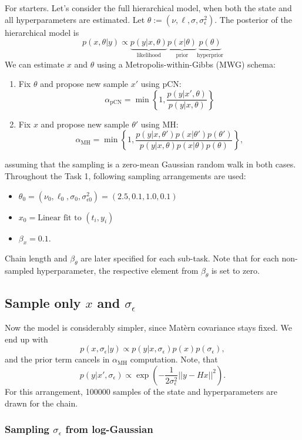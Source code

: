 \documentclass[times, a4paper, 12pt, onecolumn, oneside]{article}
\begin{document}
For starters. Let's consider the full hierarchical model, when both the state and all hyperparameters are estimated. Let $\theta:=(\nu, \ell, \sigma, \sigma_\epsilon^2)$. The posterior of the hierarchical model is
$$
p(x, \theta | y) \propto \underbrace{p(y | x, \theta)}_\text{likelihood} \underbrace{p(x | \theta)}_\text{prior} \underbrace{p(\theta)}_\text{hyperprior}
$$
We can estimate $x$ and $\theta$ using a Metropolis-within-Gibbs (MWG) schema:
\begin{enumerate}
\item Fix $\theta$ and propose new sample $x'$ using pCN:
$$
    \alpha_\text{pCN} = \min\left\{1, \frac{p(y|x',\theta)}{p(y|x,\theta)} \right\}
$$
\item Fix $x$ and propose new sample $\theta'$ using MH:
$$
    \alpha_\text{MH} = \min\left\{1, \frac{p(y|x,\theta')p(x | \theta')p(\theta')}{p(y|x,\theta)p(x | \theta)p(\theta)} \right\}, 
$$
\end{enumerate}
assuming that the sampling is a zero-mean Gaussian random walk in both cases. Throughout the Task 1, following sampling arrangements are used:
\begin{itemize}
    \item $\theta_0 = (\nu_0, \ell_0, \sigma_0, \sigma_{\epsilon 0}^2) = (2.5, 0.1, 1.0, 0.1)$
    \item $x_0 = \text{Linear fit to } (t_i, y_i)$
    \item $\beta_x = 0.1$.
\end{itemize}
Chain length and $\beta_\theta$ are later specified for each sub-task. Note that for each non-sampled hyperparameter, the respective element from $\beta_\theta$ is set to zero.

\subsection{Sample only $x$ and $\sigma_\epsilon$}

Now the model is considerably simpler, since Matèrn covariance stays fixed. We end up with
$$
p(x, \sigma_\epsilon | y) \propto p(y | x, \sigma_\epsilon) p(x) p(\sigma_\epsilon),
$$
and the prior term cancels in $\alpha_\text{MH}$ computation. Note, that
$$
p(y|x',\sigma_\epsilon) \propto \exp\left(-\frac{1}{2\sigma_\epsilon^2} ||y-Hx||^2 \right).
$$
For this arrangement, 100000 samples of the state and hyperparameters are drawn for the chain.

\subsubsection{Sampling $\sigma_\epsilon$ from log-Gaussian}
\end{document}
